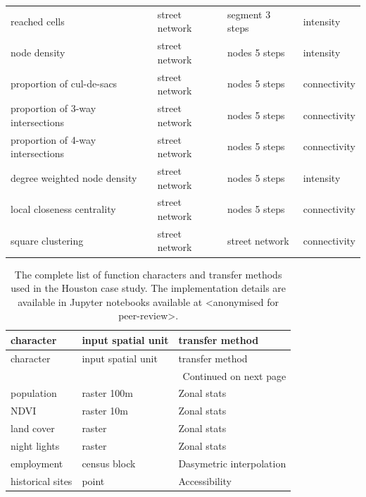 \begin{longtable}{p{5cm}p{4cm}p{4cm}l}
                           reached cells &                  street network &            segment 3 steps &    intensity \\
                            node density &                  street network &              nodes 5 steps &    intensity \\
               proportion of cul-de-sacs &                  street network &              nodes 5 steps & connectivity \\
       proportion of 3-way intersections &                  street network &              nodes 5 steps & connectivity \\
       proportion of 4-way intersections &                  street network &              nodes 5 steps & connectivity \\
            degree weighted node density &                  street network &              nodes 5 steps &    intensity \\
              local closeness centrality &                  street network &              nodes 5 steps & connectivity \\
                       square clustering &                  street network &             street network & connectivity \\
\end{longtable}

\begin{longtable}{p{5cm}p{3cm}p{5cm}}
    \caption{The complete list of function characters and transfer methods used in the Houston case study. The implementation details are available
    in Jupyter notebooks available at <anonymised for peer-review>.}
    \label{tab:fn_hou} \\
    \toprule
                                             character & input spatial unit &                                    transfer method \\
    \midrule
    \endfirsthead

    \toprule
                                             character & input spatial unit &                                    transfer method \\
    \midrule
    \endhead
    \midrule
    \multicolumn{3}{r}{{Continued on next page}} \\
    \midrule
    \endfoot

    \bottomrule
    \endlastfoot
    population &  raster 100m &              Zonal stats \\
          NDVI &   raster 10m &              Zonal stats \\
    land cover &       raster &              Zonal stats \\
  night lights &       raster &              Zonal stats \\
    employment & census block & Dasymetric interpolation \\
historical sites &        point &            Accessibility \\
\end{longtable}

